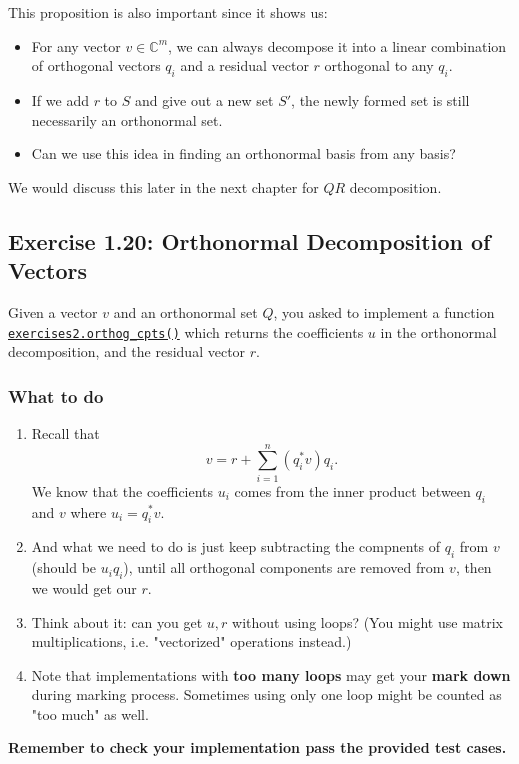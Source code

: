 \noindent This proposition is also important since it shows us:
\begin{itemize}
  \item For any vector \(v \in \mathbb{C}^{m}\), we can always decompose it into a linear combination of orthogonal vectors \(q_i\) and a residual vector \(r\) orthogonal to any \(q_i\).      
  \item If we add $r$ to $S$ and give out a new set $S'$, the newly formed set is still necessarily an orthonormal set.
  \item Can we use this idea in finding an orthonormal basis from any basis?
\end{itemize}
We would discuss this later in the next chapter for $QR$ decomposition.
\subsection*{Exercise 1.20: Orthonormal Decomposition of Vectors}
\begin{problem}
  Given a vector $v$ and an orthonormal set $Q$, you asked to implement a function \href{https://comp-lin-alg.github.io/cla_utils.html#cla_utils.exercises2.orthog_cpts}{\texttt{exercises2.orthog\_cpts()}} which returns the coefficients $u$ in the orthonormal decomposition, and the residual vector $r$.
\end{problem}

\subsubsection*{What to do}%
\begin{enumerate}
\item Recall that
  \[
    v = r + \sum_{i=1}^{n} (q^{*}_i v)q_i
  .\]
  We know that the coefficients $u_i$ comes from the inner product between $q_i$ and $v$ where $u_i = q^{*}_iv$.
\item And what we need to do is just keep subtracting the compnents of $q_i$ from $v$ (should be $u_iq_i$), until all orthogonal components are removed from  $v$, then we would get our  $r$.
\item Think about it: can you get \(u, r\) without using loops? (You might use matrix multiplications, i.e. "vectorized" operations instead.)
\item Note that implementations with \textbf{too many loops} may get your \textbf{mark down} during marking process. Sometimes using only one loop might be counted as "too much" as well.
\end{enumerate} 
\textbf{Remember to check your implementation pass the provided test cases.}
